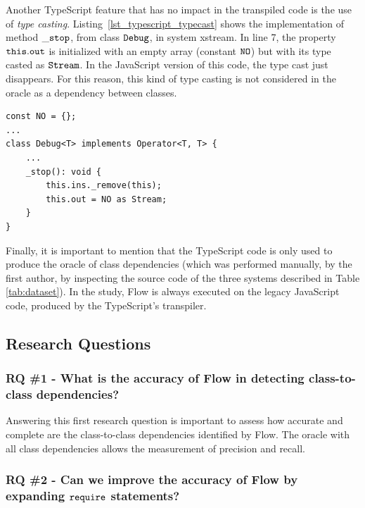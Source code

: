 \documentclass[review]{elsarticle}
\newcommand{\mcode}[1]{$\tt #1$}
\begin{document}
Another TypeScript feature that has no impact in the transpiled code is the use of \textit{type casting}. Listing~\ref{lst_typescript_typecast} shows the implementation of method \mcode{\_stop}, from class \mcode{Debug}, in system {\sc xstream}. In line 7, the property \mcode{this.out} is initialized with an empty array (constant \mcode{NO}) but with its type casted as \mcode{Stream}. In the JavaScript version of this code, the type cast just disappears. For this reason, this kind of type casting is not considered in the oracle as a dependency between classes.

\vspace{1.5 mm}

\begin{lstlisting}[caption=Example of type casting in TypeScript, label=lst_typescript_typecast, basicstyle=\ttfamily\footnotesize, emph={[2]NO,as,Stream},emphstyle={[2]\ttfamily\bfseries\color{darkgreen}}]
const NO = {};
...
class Debug<T> implements Operator<T, T> {
	...
	_stop(): void {
		this.ins._remove(this);
		this.out = NO as Stream;
	}
}  
\end{lstlisting} 


Finally, it is important to mention that the TypeScript code is only used to produce the oracle of class dependencies (which was performed manually, by the first author, by inspecting the source code of the three systems described in Table \ref{tab:dataset}). In the study, Flow is always executed on the legacy JavaScript code, produced by the TypeScript's transpiler.

\vspace{2.5 mm}

\subsection{Research Questions}
\label{subsec:rqs}

\subsubsection*{RQ \#1 - What is the accuracy of Flow in detecting class-to-class dependencies?}
\label{sec:rq1-accuracy}

Answering this first research question is important to assess how accurate and complete are the class-to-class dependencies identified by Flow. The oracle with all class dependencies allows the measurement of precision and recall.

\subsubsection*{RQ \#2 - Can we improve the accuracy of Flow by expanding \mcode{require} statements?}
\label{sec:rq3-rename}
\end{document}
